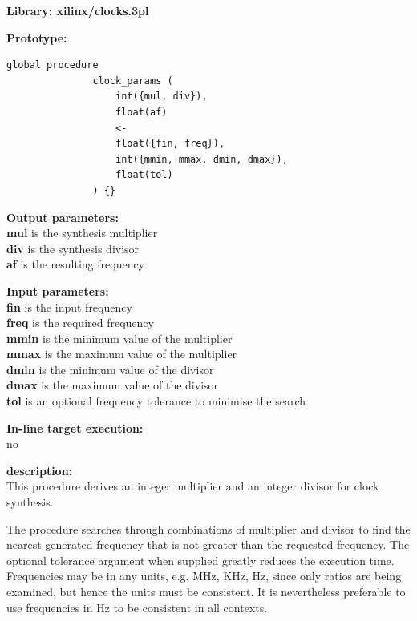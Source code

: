             {\bf Library: xilinx/clocks.3pl}

            {\bf Prototype:} \\
            \vsp
            \begin{lstlisting}[gobble=12, language=threepl]
               global procedure
               clock_params (
                   int({mul, div}),
                   float(af)
                   <-
                   float({fin, freq}),
                   int({mmin, mmax, dmin, dmax}),
                   float(tol)
               ) {}
            \end{lstlisting}
            
            {\bf Output parameters:} \\
            {\bf mul} is the synthesis multiplier \\
            {\bf div} is the synthesis divisor \\
            {\bf af} is the resulting frequency

            {\bf Input parameters:} \\
            {\bf fin} is the input frequency \\
            {\bf freq} is the required frequency \\
            {\bf mmin} is the minimum value of the multiplier \\
            {\bf mmax} is the maximum value of the multiplier \\
            {\bf dmin} is the minimum value of the divisor \\
            {\bf dmax} is the maximum value of the divisor \\
            {\bf tol} is an optional frequency tolerance to minimise the search
        
            {\bf In-line target execution:} \\
            no

            {\bf description:} \\
            This procedure derives an integer multiplier and an integer divisor
            for clock synthesis.

            The procedure searches through combinations of multiplier and divisor
            to find the nearest generated frequency that is not greater than the
            requested frequency. The optional tolerance argument when supplied
            greatly reduces the execution time. Frequencies may be in any units,
            e.g. MHz, KHz, Hz, since only ratios are being examined, but hence the
            units must be consistent. It is nevertheless preferable to use
            frequencies in Hz to be consistent in all contexts.
            
